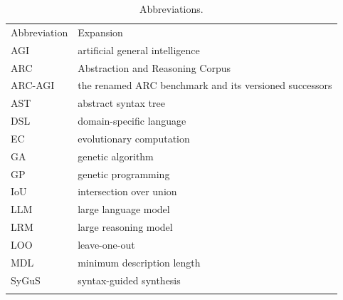 \begin{table}[htbp]
\centering
\caption{Abbreviations.}
\label{tab:app-abbrev}
\small
\begin{tabular}{p{2.6cm}p{10.4cm}}
\hline\noalign{\smallskip}
Abbreviation & Expansion \\
\noalign{\smallskip}\hline\noalign{\smallskip}
AGI & artificial general intelligence \\
ARC & Abstraction and Reasoning Corpus \\
ARC-AGI & the renamed ARC benchmark and its versioned successors \\
AST & abstract syntax tree \\
DSL & domain-specific language \\
EC & evolutionary computation \\
GA & genetic algorithm \\
GP & genetic programming \\
IoU & intersection over union \\
LLM & large language model \\
LRM & large reasoning model \\
LOO & leave-one-out \\
MDL & minimum description length \\
SyGuS & syntax-guided synthesis \\
\noalign{\smallskip}\hline
\end{tabular}
\end{table}
